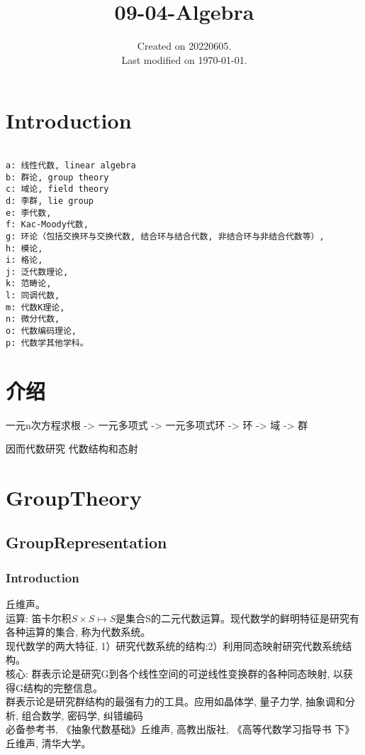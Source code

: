 \documentclass[UTF8]{../09-Mathematics}
\begin{document}
\title{09-04-Algebra}
\date{Created on 20220605.\\   Last modified on \today.}
\maketitle
\tableofcontents


\chapter{Introduction}


\begin{lstlisting}

a: 线性代数, linear algebra
b: 群论, group theory
c: 域论, field theory
d: 李群, lie group
e: 李代数, 
f: Kac-Moody代数, 
g: 环论（包括交换环与交换代数, 结合环与结合代数, 非结合环与非结合代数等）, 
h: 模论, 
i: 格论, 
j: 泛代数理论, 
k: 范畴论, 
l: 同调代数, 
m: 代数K理论, 
n: 微分代数, 
o: 代数编码理论, 
p: 代数学其他学科。

\end{lstlisting}



\chapter{介绍}

一元n次方程求根 -> 一元多项式 -> 一元多项式环  -> 环  -> 域 -> 群 

因而代数研究 代数结构和态射



\chapter{GroupTheory}

\section{GroupRepresentation}

\subsection{Introduction}
丘维声。\\
运算: 笛卡尔积$S \times S \mapsto S$是集合S的二元代数运算。现代数学的鲜明特征是研究有各种运算的集合, 称为代数系统。\\
现代数学的两大特征, 1）研究代数系统的结构;2）利用同态映射研究代数系统结构。\\
核心: 群表示论是研究G到各个线性空间的可逆线性变换群的各种同态映射, 以获得G结构的完整信息。\\
群表示论是研究群结构的最强有力的工具。应用如晶体学, 量子力学, 抽象调和分析, 组合数学, 密码学, 纠错编码\\
必备参考书, 《抽象代数基础》丘维声, 高教出版社, 《高等代数学习指导书 下》丘维声, 清华大学。
\end{document}
